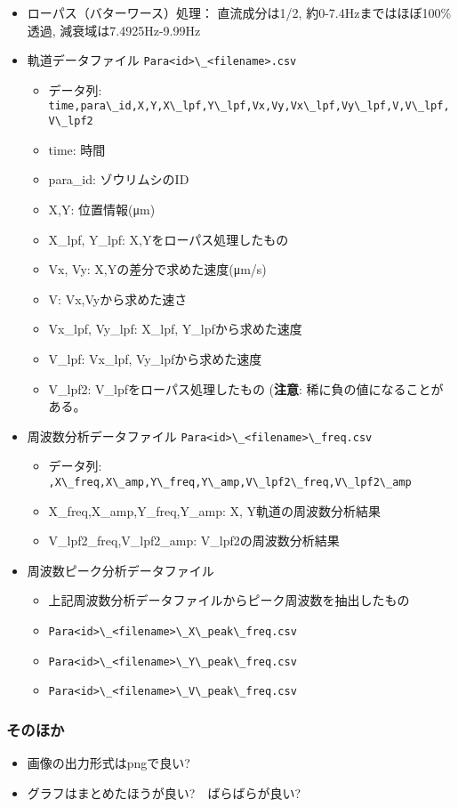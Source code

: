 \documentclass[]{jsarticle}
\newcommand{\passthrough}[1]{#1}
\providecommand{\tightlist}{%
   \setlength{\itemsep}{0pt}\setlength{\parskip}{0pt}}
\begin{document}
\begin{itemize}
\tightlist
\item
  ローパス（バターワース）処理： 直流成分は1/2,
  約0-7.4Hzまではほぼ100\%透過, 減衰域は7.4925Hz-9.99Hz
\item
  軌道データファイル \passthrough{\lstinline!Para<id>\_<filename>.csv!}

  \begin{itemize}
  \tightlist
  \item
    データ列:
    \passthrough{\lstinline!time,para\_id,X,Y,X\_lpf,Y\_lpf,Vx,Vy,Vx\_lpf,Vy\_lpf,V,V\_lpf,V\_lpf2!}
  \item
    time: 時間
  \item
    para\_id: ゾウリムシのID
  \item
    X,Y: 位置情報(μm)
  \item
    X\_lpf, Y\_lpf: X,Yをローパス処理したもの
  \item
    Vx, Vy: X,Yの差分で求めた速度(μm/s)
  \item
    V: Vx,Vyから求めた速さ
  \item
    Vx\_lpf, Vy\_lpf: X\_lpf, Y\_lpfから求めた速度
  \item
    V\_lpf: Vx\_lpf, Vy\_lpfから求めた速度
  \item
    V\_lpf2: V\_lpfをローパス処理したもの (\textbf{注意}:
    稀に負の値になることがある。
  \end{itemize}
\item
  周波数分析データファイル
  \passthrough{\lstinline!Para<id>\_<filename>\_freq.csv!}

  \begin{itemize}
  \tightlist
  \item
    データ列:
    \passthrough{\lstinline!,X\_freq,X\_amp,Y\_freq,Y\_amp,V\_lpf2\_freq,V\_lpf2\_amp!}
  \item
    X\_freq,X\_amp,Y\_freq,Y\_amp: X, Y軌道の周波数分析結果
  \item
    V\_lpf2\_freq,V\_lpf2\_amp: V\_lpf2の周波数分析結果
  \end{itemize}
\item
  周波数ピーク分析データファイル

  \begin{itemize}
  \tightlist
  \item
    上記周波数分析データファイルからピーク周波数を抽出したもの
  \item
    \passthrough{\lstinline!Para<id>\_<filename>\_X\_peak\_freq.csv!}
  \item
    \passthrough{\lstinline!Para<id>\_<filename>\_Y\_peak\_freq.csv!}
  \item
    \passthrough{\lstinline!Para<id>\_<filename>\_V\_peak\_freq.csv!}
  \end{itemize}
\end{itemize}

\hypertarget{ux305dux306eux307bux304b}{%
\subsubsection{そのほか}\label{ux305dux306eux307bux304b}}

\begin{itemize}
\tightlist
\item
  画像の出力形式はpngで良い?
\item
  グラフはまとめたほうが良い?　ばらばらが良い?
\end{itemize}
\end{document}
